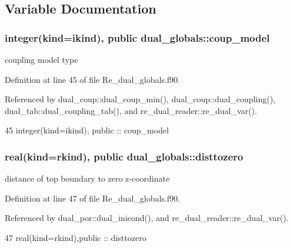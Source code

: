 \subsection{Variable Documentation}
\subsubsection[{coup\+\_\+model}]{\setlength{\rightskip}{0pt plus 5cm}integer(kind=ikind), public dual\+\_\+globals\+::coup\+\_\+model}\label{namespacedual__globals_a84403212967c8c21860b5369ee56c6a0}


coupling model type 



Definition at line 45 of file Re\+\_\+dual\+\_\+globals.\+f90.



Referenced by dual\+\_\+coup\+::dual\+\_\+coup\+\_\+min(), dual\+\_\+coup\+::dual\+\_\+coupling(), dual\+\_\+tab\+::dual\+\_\+coupling\+\_\+tab(), and re\+\_\+dual\+\_\+reader\+::re\+\_\+dual\+\_\+var().


\begin{DoxyCode}
45   \textcolor{keywordtype}{integer(kind=ikind)}, \textcolor{keywordtype}{public} :: coup_model
\end{DoxyCode}
\subsubsection[{disttozero}]{\setlength{\rightskip}{0pt plus 5cm}real(kind=rkind), public dual\+\_\+globals\+::disttozero}\label{namespacedual__globals_a5f70bcc05cdd95957a1314e8aad7a87a}


distance of top boundary to zero z-\/coordinate 



Definition at line 47 of file Re\+\_\+dual\+\_\+globals.\+f90.



Referenced by dual\+\_\+por\+::dual\+\_\+inicond(), and re\+\_\+dual\+\_\+reader\+::re\+\_\+dual\+\_\+var().


\begin{DoxyCode}
47   \textcolor{keywordtype}{real(kind=rkind)},\textcolor{keywordtype}{public} :: disttozero
\end{DoxyCode}
